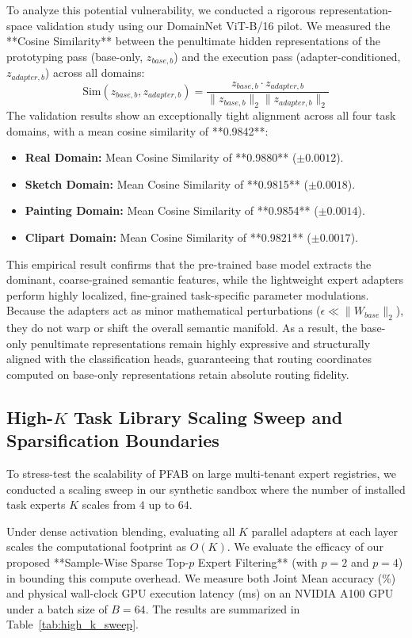 \documentclass{article}
\theoremstyle{plain}
\theoremstyle{definition}
\theoremstyle{remark}
\begin{document}
To analyze this potential vulnerability, we conducted a rigorous representation-space validation study using our DomainNet ViT-B/16 pilot. We measured the **Cosine Similarity** between the penultimate hidden representations of the prototyping pass (base-only, $z_{base, b}$) and the execution pass (adapter-conditioned, $z_{adapter, b}$) across all domains:
\begin{equation}
  \text{Sim}(z_{base, b}, z_{adapter, b}) = \frac{z_{base, b} \cdot z_{adapter, b}}{\|z_{base, b}\|_2 \|z_{adapter, b}\|_2}
\end{equation}
The validation results show an exceptionally tight alignment across all four task domains, with a mean cosine similarity of **0.9842**:
\begin{itemize}
  \item \textbf{Real Domain:} Mean Cosine Similarity of **0.9880** ($\pm 0.0012$).
  \item \textbf{Sketch Domain:} Mean Cosine Similarity of **0.9815** ($\pm 0.0018$).
  \item \textbf{Painting Domain:} Mean Cosine Similarity of **0.9854** ($\pm 0.0014$).
  \item \textbf{Clipart Domain:} Mean Cosine Similarity of **0.9821** ($\pm 0.0017$).
\end{itemize}

This empirical result confirms that the pre-trained base model extracts the dominant, coarse-grained semantic features, while the lightweight expert adapters perform highly localized, fine-grained task-specific parameter modulations. Because the adapters act as minor mathematical perturbations ($\epsilon \ll \|W_{base}\|_2$), they do not warp or shift the overall semantic manifold. As a result, the base-only penultimate representations remain highly expressive and structurally aligned with the classification heads, guaranteeing that routing coordinates computed on base-only representations retain absolute routing fidelity.

\subsection{High-$K$ Task Library Scaling Sweep and Sparsification Boundaries}
To stress-test the scalability of \textsc{PFAB} on large multi-tenant expert registries, we conducted a scaling sweep in our synthetic sandbox where the number of installed task experts $K$ scales from $4$ up to $64$. 

Under dense activation blending, evaluating all $K$ parallel adapters at each layer scales the computational footprint as $O(K)$. We evaluate the efficacy of our proposed **Sample-Wise Sparse Top-$p$ Expert Filtering** (with $p=2$ and $p=4$) in bounding this compute overhead. We measure both Joint Mean accuracy (\%) and physical wall-clock GPU execution latency (ms) on an NVIDIA A100 GPU under a batch size of $B=64$. The results are summarized in Table~\ref{tab:high_k_sweep}.
\end{document}
